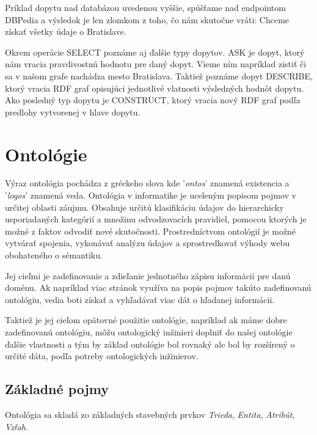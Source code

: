 \documentclass[12pt, a4paper, oneside]{book}
\begin{document}
Príklad dopytu nad databázou uvedenou vyššie, spúšťame nad endpointom DBPedia a výsledok je len zlomkom z toho, čo nám skutočne vráti: Chceme získať všetky údaje o Bratislave.


Okrem operácie SELECT poznáme aj ďalšie typy dopytov. ASK je dopyt, ktorý nám vracia pravdivostnú hodnotu pre daný dopyt. Vieme ním napríklad zistiť či sa v našom grafe nachádza mesto Bratislava. Taktiež poznáme dopyt DESCRIBE, ktorý vracia RDF graf opisujúci jednotlivé vlatnosti výsledných hodnôt dopytu. Ako posledný typ dopytu je CONSTRUCT, ktorý vracia nový RDF graf podľa predlohy vytvorenej v hlave dopytu.

\chapter{Ontológie}



Výraz ontológia \cite{ontology} pochádza z gréckeho slova kde '\textit{ontos}' znamená existencia a '\textit{logos}' znamená veda. Ontológia v informatike je uceleným popisom pojmov v určitej oblasti záujmu. Obsahuje určitú klasifikáciu údajov do hierarchicky usporiadaných kategórií a množinu odvodzovacích pravidiel, pomocou ktorých je možné z faktov odvodiť nové skutočnosti. Prostredníctvom ontológií je možné vytvárať spojenia, vykonávať analýzu údajov a sprostredkovať výhody webu obohateného o sémantiku. 


Jej cieľmi je zadefinovanie a zdieľanie jednotného zápisu informácií pre danú doménu. Ak napríklad viac stránok využíva na popis pojmov takúto zadefinovanú ontológiu, vedia boti získať a vyhľadávať viac dát o hľadanej informácii.


Taktiež je jej cieľom opätovné použitie ontológie, napríklad ak máme dobre zadefinovanú ontológiu, môžu ontologický inžinieri doplniť do našej ontológie ďalšie vlastnosti a tým by základ ontológie bol rovnaký ale bol by rozšírený o určité dáta, podľa potreby ontologických inžinierov.



\section{Základné pojmy}
Ontológia sa skladá zo základných stavebných prvkov \textit{Trieda}, \textit{Entita}, \textit{Atribút}, \textit{Vzťah}. 
\end{document}
